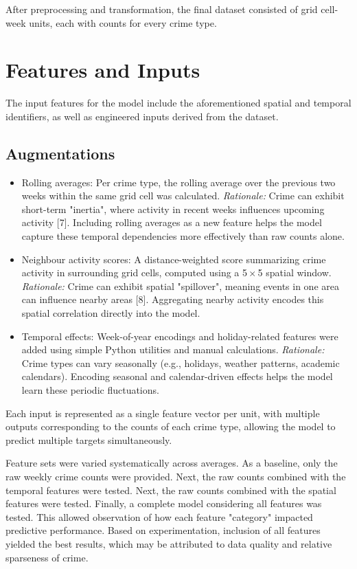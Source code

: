 \documentclass[11pt]{article}
\begin{document}
After preprocessing and transformation, the final dataset consisted of grid cell-week units, each with counts for every crime type.


\section{Features and Inputs}

The input features for the model include the aforementioned spatial and temporal identifiers, as well as engineered inputs derived from the dataset.

\subsection{Augmentations}
\begin{itemize}
    \item Rolling averages: Per crime type, the rolling average over the previous two weeks within the same grid cell was calculated. \textit{Rationale:} Crime can exhibit short-term "inertia", where activity in recent weeks influences upcoming activity [7]. Including rolling averages as a new feature helps the model capture these temporal dependencies more effectively than raw counts alone.
    \item Neighbour activity scores: A distance-weighted score summarizing crime activity in surrounding grid cells, computed using a 5\,$\times$\,5 spatial window. \textit{Rationale:} Crime can exhibit spatial "spillover", meaning events in one area can influence nearby areas [8]. Aggregating nearby activity encodes this spatial correlation directly into the model.
    \item Temporal effects: Week-of-year encodings and holiday-related features were added using simple Python utilities and manual calculations. \textit{Rationale:} Crime types can vary seasonally (e.g., holidays, weather patterns, academic calendars). Encoding seasonal and calendar-driven effects helps the model learn these periodic fluctuations.
\end{itemize}

Each input is represented as a single feature vector per unit, with multiple outputs corresponding to the counts of each crime type, allowing the model to predict multiple targets simultaneously.

Feature sets were varied systematically across averages. As a baseline, only the raw weekly crime counts were provided. Next, the raw counts combined with the temporal features were tested. Next, the raw counts combined with the spatial features were tested. Finally, a complete model considering all features was tested. This allowed observation of how each feature "category" impacted predictive performance. Based on experimentation, inclusion of all features yielded the best results, which may be attributed to data quality and relative sparseness of crime.
\end{document}
